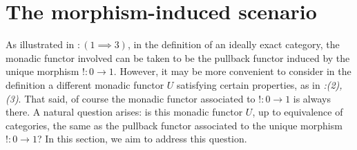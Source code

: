 \section{The morphism-induced scenario}

As illustrated in $\mathit{:(1\implies 3)}$, in the definition of an ideally exact category, the monadic functor involved can be taken to be the pullback functor induced by the unique morphism $!:0 \to 1$. However, it may be more convenient to consider in the definition a different monadic functor $U$ satisfying certain properties, as in \textit{:(2),(3)}. That said, of course the monadic functor associated to $!:0 \to 1$ is always there. A natural question arises: is this monadic functor $U$, up to equivalence of categories, the same as the pullback functor associated to the unique morphism $!:0 \to 1$? In this section, we aim to address this question.

